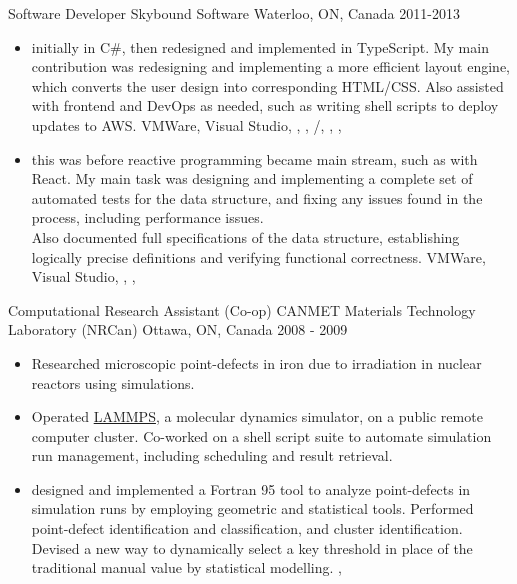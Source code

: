 \cventry
  {Software Developer} %
  {Skybound Software} %
  {Waterloo, ON, Canada} %
  {2011-2013} %
  {
    \begin{itemize} %
      \liststyle
      \item{ initially in C\#, then redesigned and implemented in TypeScript. 
      My main contribution was redesigning and implementing a more efficient layout engine, which converts the user design into corresponding HTML/CSS.
      Also assisted with frontend and DevOps as needed, such as writing shell scripts to deploy updates to AWS.
      \tgskills VMWare, Visual Studio, \rfcsharp, \rftypescript, \rfhtml/\rfcss, \rfmercurial, \rfbash, \rfaws
      }

      \item{
      this was before reactive programming became main stream, such as with React.
      My main task was designing and implementing a complete set of automated tests for the data structure, and fixing any issues found in the process, including performance issues. \\
      Also documented full specifications of the data structure, establishing logically precise definitions and verifying functional correctness.
      \tgskills VMWare, Visual Studio, \rfcsharp, \rflatex, \rfmercurial

      }
    \end{itemize}
  }

\cventry
  {Computational Research Assistant (Co-op)} %
  {CANMET Materials Technology Laboratory (NRCan)} %
  {Ottawa, ON, Canada} %
  {2008 - 2009} %
  {
    \begin{itemize} %
      \liststyle
      \item{
        Researched microscopic point-defects in iron due to irradiation in nuclear reactors using simulations.}
      \item{Operated \href{https://www.lammps.org/}{LAMMPS}, a molecular dynamics simulator, on a public remote computer cluster. 
        Co-worked on a shell script suite to automate simulation run management, including scheduling and result retrieval.
      }
    \item{
       designed and implemented a Fortran 95 tool to analyze point-defects in simulation runs by employing geometric and statistical tools. 
      Performed point-defect identification and classification, and cluster identification.
      Devised a new way to dynamically select a key threshold in place of the traditional manual value by statistical modelling.
\tgskills \rffortran, \rfclang
    }
    \end{itemize}
  }



